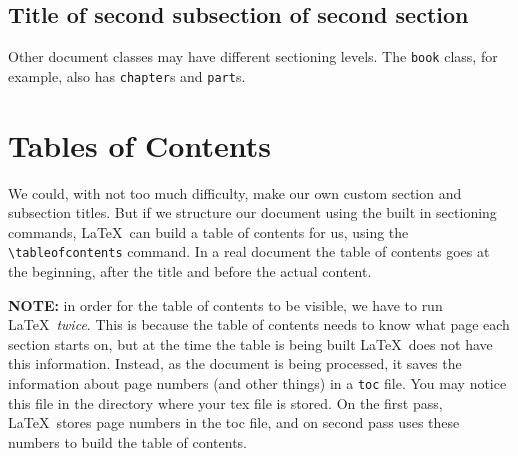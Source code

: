 \documentclass{article}
\begin{document}
\subsection{Title of second subsection of second section}

Other document classes may have different sectioning levels. The \texttt{book} class, for example, also has \texttt{chapter}s and \texttt{part}s.

\section{Tables of Contents}

We could, with not too much difficulty, make our own custom section and subsection titles. But if we structure our document using the built in sectioning commands, \LaTeX\ can build a table of contents for us, using the \verb|\tableofcontents| command. In a real document the table of contents goes at the beginning, after the title and before the actual content.

\textbf{NOTE:} in order for the table of contents to be visible, we have to run \LaTeX\ \emph{twice}. This is because the table of contents needs to know what page each section starts on, but at the time the table is being built \LaTeX\ does not have this information. Instead, as the document is being processed, it saves the information about page numbers (and other things) in a \texttt{toc} file. You may notice this file in the directory where your tex file is stored. On the first pass, \LaTeX\ stores page numbers in the toc file, and on second pass uses these numbers to build the table of contents.

\tableofcontents
\end{document}

